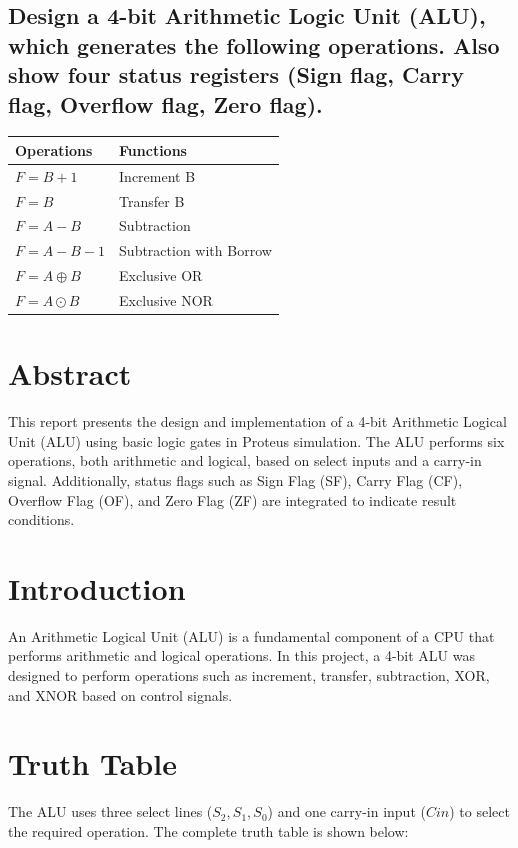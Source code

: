 \documentclass[12pt]{article}
\begin{document}
\subsection*{Design a 4-bit Arithmetic Logic Unit (ALU), which generates the following operations. Also
show four status registers (Sign flag, Carry flag, Overflow flag, Zero flag).}
\begin{center}
\renewcommand{\arraystretch}{1.4}
\begin{tabular}{|l|l|}
\hline
\textbf{Operations} & \textbf{Functions} \\ \hline
$F = B + 1$ & Increment B \\ \hline
$F = B$ & Transfer B \\ \hline
$F = A - B$ & Subtraction \\ \hline
$F = A - B - 1$ & Subtraction with Borrow \\ \hline
$F = A \oplus B$ & Exclusive OR \\ \hline
$F = A \odot B$ & Exclusive NOR \\ \hline
\end{tabular}
\end{center}


\section{Abstract}
This report presents the design and implementation of a 4-bit Arithmetic Logical Unit (ALU) using basic logic gates in Proteus simulation. 
The ALU performs six operations, both arithmetic and logical, based on select inputs and a carry-in signal. 
Additionally, status flags such as Sign Flag (SF), Carry Flag (CF), Overflow Flag (OF), and Zero Flag (ZF) are integrated to indicate result conditions.

\section{Introduction}
An Arithmetic Logical Unit (ALU) is a fundamental component of a CPU that performs arithmetic and logical operations. 
In this project, a 4-bit ALU was designed to perform operations such as increment, transfer, subtraction, XOR, and XNOR based on control signals.

\section{Truth Table}
The ALU uses three select lines ($S_2, S_1, S_0$) and one carry-in input ($Cin$) to select the required operation. 
The complete truth table is shown below:
\end{document}
